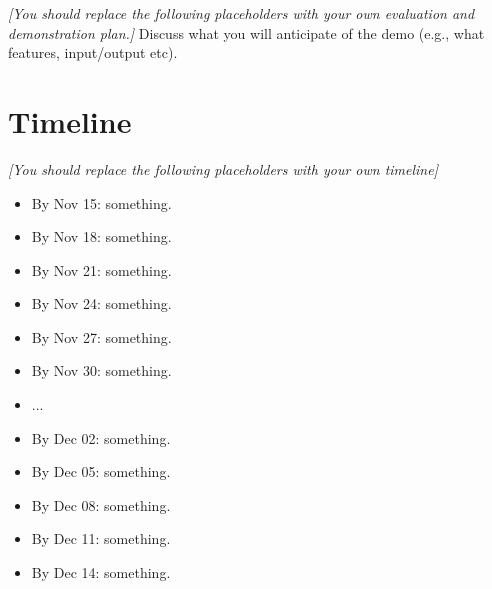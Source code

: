 \documentclass[10pt,twocolumn,letterpaper]{article}
\newcommand{\note}[1]{{\it\color{red} #1}}
\begin{document}
\note{[You should replace the following placeholders with your own evaluation and demonstration plan.]} Discuss what you will anticipate of the demo (e.g., what features, input/output etc). 

\section{Timeline}
\label{sec:timeline}
\cite{clouse1992teaching}
\note{[You should replace the following placeholders with your own timeline]}
\begin{itemize}
    \item By Nov 15: something.
    \item By Nov 18: something.
    \item By Nov 21: something.
    \item By Nov 24: something.
    \item By Nov 27: something.
    \item By Nov 30: something.
    \item ...
    \item By Dec 02: something.
    \item By Dec 05: something.
    \item By Dec 08: something.
    \item By Dec 11: something.
    \item By Dec 14: something.
\end{itemize}


{\small


}
\end{document}
